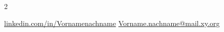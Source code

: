 \documentclass[pastel]{hipstercv}
\newlength{\rightcolwidth}
\begin{document}
\begin{paracol}{2}
\setlength{\parindent}{0pt}
\begin{minipage}[t]{\rightcolwidth}
\begin{center}\fontfamily{\sfdefault}\selectfont \color{black!70}%
{\small  {}\href{https://www.linkedin.com/in/Vornamenachname/}{linkedin.com/in/Vornamenachname} \href{mailto:Vorname.nachname@mail.xy.org}{Vorname.nachname@mail.xy.org}
}

\end{center}
\end{minipage}

\end{paracol}
\end{document}
